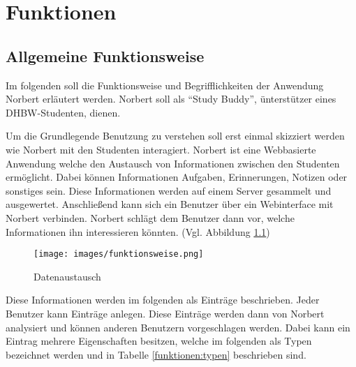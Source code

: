 \chapter{Funktionen}

\section{Allgemeine Funktionsweise}

Im folgenden soll die Funktionsweise und Begrifflichkeiten der Anwendung Norbert erläutert werden.
Norbert soll als \enquote{Study Buddy}, ünterstützer eines DHBW-Studenten, dienen.

Um die Grundlegende Benutzung zu verstehen soll erst einmal skizziert werden wie Norbert mit den Studenten interagiert.
Norbert ist eine Webbasierte Anwendung welche den Austausch von Informationen zwischen den Studenten ermöglicht.
Dabei können Informationen Aufgaben, Erinnerungen, Notizen oder sonstiges sein.
Diese Informationen werden auf einem Server gesammelt und ausgewertet.
Anschließend kann sich ein Benutzer über ein Webinterface mit Norbert verbinden.
Norbert schlägt dem Benutzer dann vor, welche Informationen ihn interessieren könnten. (Vgl. Abbildung \ref{funktionen:datenaustausch})

\begin{figure}[H]
    \centering
    \texttt{[image: images/funktionsweise.png]}
    \caption{Datenaustausch}
    \label{funktionen:datenaustausch}
\end{figure}

Diese Informationen werden im folgenden als Einträge beschrieben.
Jeder Benutzer kann Einträge anlegen. Diese Einträge werden dann von Norbert analysiert und können anderen Benutzern vorgeschlagen werden.
Dabei kann ein Eintrag mehrere Eigenschaften besitzen, welche im folgenden als Typen bezeichnet werden und in Tabelle \ref{funktionen:typen} beschrieben sind.

